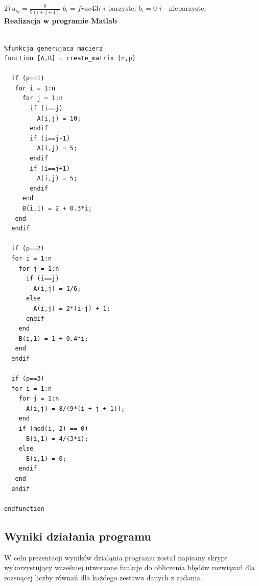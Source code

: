 \documentclass[a4paper, 11pt]{article}
\begin{document}
\hspace{2,4cm} $2) \ a_{ij} = \frac{8}{9(i+j+1)}$  \hspace{1cm} $b_{i} =frac{4}{3i}$ $i$ parzyste; $b_{i} = 0$ $i$ - nieparzyste; \\

\textbf{Realizacja w programie Matlab}\\
\\
\begin{lstlisting}
%funkcja generujaca macierz 
function [A,B] = create_matrix (n,p)

  if (p==1)
   for i = 1:n
     for j = 1:n
       if (i==j)
         A(i,j) = 10;
       endif
       if (i==j-1)
         A(i,j) = 5;
       endif
       if (i==j+1)
         A(i,j) = 5;
       endif
     end
     B(i,1) = 2 + 0.3*i;
   end
  endif

  if (p==2) 
  for i = 1:n
    for j = 1:n
      if (i==j)
        A(i,j) = 1/6;
      else
        A(i,j) = 2*(i-j) + 1;
      endif
    end
    B(i,1) = 1 + 0.4*i;
   end
  endif

  if (p==3)
  for i = 1:n
    for j = 1:n
      A(i,j) = 8/(9*(i + j + 1));
    end
    if (mod(i, 2) == 0)
      B(i,1) = 4/(3*i);
    else
      B(i,1) = 0;
    endif
   end
  endif
  
endfunction
\end{lstlisting}

\subsection{Wyniki działania programu}
W celu prezentacji wyników działąnia programu został napisany skrypt wykorzystujący wcześniej utworzone funkcje do obliczenia błędów rozwiązań dla rozsnącej liczby równań dla każdego zestawu danych z zadania. \\
\end{document}

